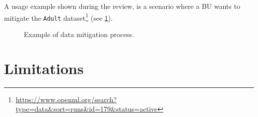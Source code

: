 \documentclass[12pt,a4paper,openright,twoside]{book}
\begin{document}
A usage example shown during the review, is a scenario where a \ac{BU} wants to mitigate the \texttt{Adult} dataset\footnote{\href{https://www.openml.org/search?type=data\&sort=runs\&id=179\&status=active}{https://www.openml.org/search?type=data\&sort=runs\&id=179\&status=active}} (see \cref{fig:gui}).



\begin{figure}
    \centering
    \hfill
    \caption{Example of data mitigation process.}
    \label{fig:gui}
\end{figure}

\section{Limitations}
\end{document}
